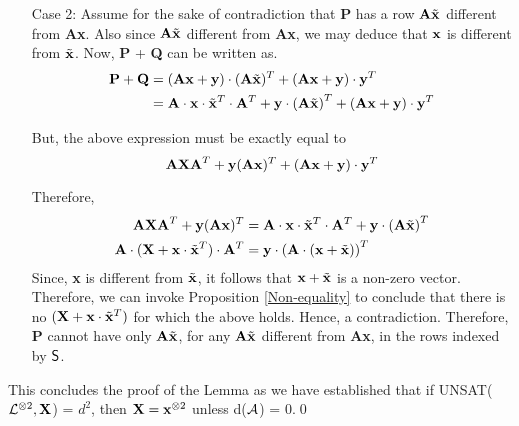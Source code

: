 {\begin{enumerate}
\item [Case 2:] Assume for the sake of contradiction that {\bf P} has a row ${\bf
    A}\tilde{\bf x}$ different from {\bf Ax}. Also  since 
${\bf A}\tilde{\bf x}$ different from {\bf Ax}, we may deduce that 
${\bf x}$ is different from  $\tilde{\bf x}$.  Now, {\bf P} + {\bf Q} can be written
as.
\begin{align*}
  {\bf  P} + {\bf Q} &= ({\bf Ax} +
  {\bf y}) \cdot ({\bf A}\tilde{\bf x})^T + \left({\bf Ax} + {\bf y}
  \right)\cdot {\bf y}^T \\
  & = {\bf A} \cdot {\bf x} \cdot \tilde{\bf x}^T \cdot
  {\bf A}^T + {\bf y}\cdot \left({\bf A}\tilde{\bf x}\right)^T +  \left( {\bf Ax} + {\bf y} \right)\cdot {\bf y}^T
\end{align*}

But, the above expression must be exactly equal to 
 \[
 {\bf AXA}^T + {\bf y}({\bf Ax})^T + \left({\bf Ax} + {\bf y} \right)\cdot {\bf y}^T
\]

Therefore,
\begin{align*}
  {\bf AXA}^T + {\bf y}({\bf Ax})^T &= {\bf A} \cdot {\bf x} \cdot
  \tilde{\bf x}^T \cdot
  {\bf A}^T + {\bf y}\cdot \left({\bf A}\tilde{\bf x}\right)^T\\
  {\bf A} \cdot ({\bf X} + {\bf x} \cdot \tilde{\bf x}^T) \cdot {\bf A}^T &= {\bf y} \cdot \left({\bf A} \cdot \left({\bf x} + \tilde{\bf x}\right)\right)^T
\end{align*}
Since, {\bf x} is different from $\tilde{\bf x}$, it follows that
${\bf x} + \tilde{\bf x}$ is a non-zero vector. Therefore, we can invoke Proposition \ref{Non-equality}
to conclude that there is no $({\bf X} + {\bf x} \cdot \tilde{\bf x}^T)$ for which
the above holds. Hence, a contradiction. Therefore, {\bf P} cannot have 
only ${\bf A}\tilde{\bf x}$, for any ${\bf A}\tilde{\bf x}$ 
different from {\bf Ax}, in the rows indexed by ${\sf S}$.
\end{enumerate}

This concludes the proof of the Lemma as we have established that if 
UNSAT(${\cal L}^{\otimes 2}, {\bf X}$) = $d^2$,
then ${\bf X} = {\bf x}^{\otimes 2}$ unless d(${\cal A}$) = 0.\qed 

\newpage}


